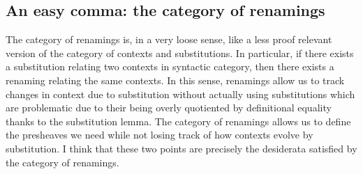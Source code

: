 \documentclass[12pt,twoside]{reedthesis}
\theoremstyle{definition}
\theoremstyle{remark}
\theoremstyle{plain}
\begin{document}
\subsection{An easy comma: the category of renamings}
The category of renamings is, in a very loose sense, like a less proof relevant
version of the category of contexts and substitutions. In particular, if there
exists a substitution relating two contexts in syntactic category, then there
exists a renaming relating the same contexts. In this sense, renamings allow us
to track changes in context due to substitution without actually using
substitutions which are problematic due to their being overly quotiented by
definitional equality thanks to the substitution lemma. The category of
renamings allows us to define the presheaves we need while not losing track of
how contexts evolve by substitution. I think that these two points are precisely
the desiderata satisfied by the category of renamings.
\end{document}
